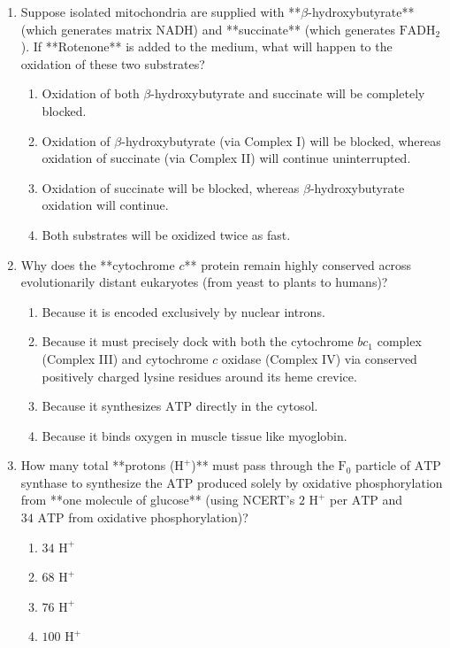 \documentclass[11pt, a4paper]{article}
\begin{document}
\begin{enumerate}[label=\textbf{\arabic*.}]
\item Suppose isolated mitochondria are supplied with **$\beta$-hydroxybutyrate** (which generates matrix $\text{NADH}$) and **succinate** (which generates $\text{FADH}_2$). If **Rotenone** is added to the medium, what will happen to the oxidation of these two substrates?
\begin{enumerate}[label=(\Alph*)]
    \item Oxidation of both $\beta$-hydroxybutyrate and succinate will be completely blocked.
    \item Oxidation of $\beta$-hydroxybutyrate (via Complex I) will be blocked, whereas oxidation of succinate (via Complex II) will continue uninterrupted.
    \item Oxidation of succinate will be blocked, whereas $\beta$-hydroxybutyrate oxidation will continue.
    \item Both substrates will be oxidized twice as fast.
\end{enumerate}

\item Why does the **cytochrome $c$** protein remain highly conserved across evolutionarily distant eukaryotes (from yeast to plants to humans)?
\begin{enumerate}[label=(\Alph*)]
    \item Because it is encoded exclusively by nuclear introns.
    \item Because it must precisely dock with both the cytochrome $bc_1$ complex (Complex III) and cytochrome $c$ oxidase (Complex IV) via conserved positively charged lysine residues around its heme crevice.
    \item Because it synthesizes $\text{ATP}$ directly in the cytosol.
    \item Because it binds oxygen in muscle tissue like myoglobin.
\end{enumerate}

\item How many total **protons ($\text{H}^+$)** must pass through the $\text{F}_0$ particle of $\text{ATP}$ synthase to synthesize the $\text{ATP}$ produced solely by oxidative phosphorylation from **one molecule of glucose** (using NCERT's $2\text{ H}^+$ per $\text{ATP}$ and $34\text{ ATP}$ from oxidative phosphorylation)?
\begin{enumerate}[label=(\Alph*)]
    \item $34\text{ H}^+$
    \item $68\text{ H}^+$
    \item $76\text{ H}^+$
    \item $100\text{ H}^+$
\end{enumerate}


\end{enumerate}
\end{document}
